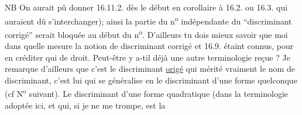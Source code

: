 NB On aurait pû donner 16.11.2. dès le début en corollaire à
16.2. ou 16.3. \hand{(} qui auraient dû s'interchanger); ainsi la partie du n\textsuperscript{o}
indépendante du ``discriminant corrigé'' serait bloquée au début du n\textsuperscript{o}.
D'ailleurs tu dois mieux savoir que moi dans quelle mesure la notion
de discriminant corrigé et 16.9. étaint connus, pour en créditer qui de
droit. Peut-être y a-t\unsure{-}il déjà une autre terminologie reçue ? Je remarque
d'ailleurs que c'est le discriminant \uline{origé} qui mérité vraiment le nom
de discriminant, c'est lui qui se généralise en le discriminant d'une
forme quelconque (cf N\textsuperscript{o} suivant). Le discriminant d'une forme quadratique
(dans la terminologie adoptée ici, et qui, si je ne me trompe, est la

